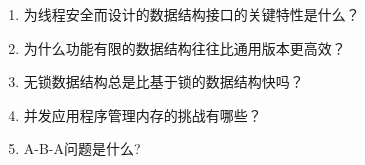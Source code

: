 \begin{enumerate}
\item 
为线程安全而设计的数据结构接口的关键特性是什么？

\item 
为什么功能有限的数据结构往往比通用版本更高效？

\item 
无锁数据结构总是比基于锁的数据结构快吗？

\item
并发应用程序管理内存的挑战有哪些？

\item
A-B-A问题是什么?
\end{enumerate}